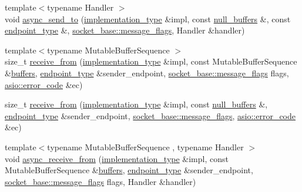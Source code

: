 \begin{DoxyCompactItemize}
\item 
{\footnotesize template$<$typename Handler $>$ }\\void \hyperlink{classasio_1_1detail_1_1reactive__socket__service_a44206a88181be24e860ff0d17de1cafd}{async\+\_\+send\+\_\+to} (\hyperlink{structasio_1_1detail_1_1reactive__socket__service_1_1implementation__type}{implementation\+\_\+type} \&impl, const \hyperlink{classasio_1_1null__buffers}{null\+\_\+buffers} \&, const \hyperlink{classasio_1_1detail_1_1reactive__socket__service_adad302be53c8a4ea6e7693bc88595381}{endpoint\+\_\+type} \&, \hyperlink{classasio_1_1socket__base_ac3cf77465dfedfe1979b5415cf32cc94}{socket\+\_\+base\+::message\+\_\+flags}, Handler \&handler)
\item 
{\footnotesize template$<$typename Mutable\+Buffer\+Sequence $>$ }\\size\+\_\+t \hyperlink{classasio_1_1detail_1_1reactive__socket__service_af0c9420eaeeecd92044741a5fadfe5e3}{receive\+\_\+from} (\hyperlink{structasio_1_1detail_1_1reactive__socket__service_1_1implementation__type}{implementation\+\_\+type} \&impl, const Mutable\+Buffer\+Sequence \&\hyperlink{group__async__read_ga54dede45c3175148a77fe6635222c47d}{buffers}, \hyperlink{classasio_1_1detail_1_1reactive__socket__service_adad302be53c8a4ea6e7693bc88595381}{endpoint\+\_\+type} \&sender\+\_\+endpoint, \hyperlink{classasio_1_1socket__base_ac3cf77465dfedfe1979b5415cf32cc94}{socket\+\_\+base\+::message\+\_\+flags} flags, \hyperlink{classasio_1_1error__code}{asio\+::error\+\_\+code} \&ec)
\item 
size\+\_\+t \hyperlink{classasio_1_1detail_1_1reactive__socket__service_a5b0347cdd0aefe067f10ba7150dce20a}{receive\+\_\+from} (\hyperlink{structasio_1_1detail_1_1reactive__socket__service_1_1implementation__type}{implementation\+\_\+type} \&impl, const \hyperlink{classasio_1_1null__buffers}{null\+\_\+buffers} \&, \hyperlink{classasio_1_1detail_1_1reactive__socket__service_adad302be53c8a4ea6e7693bc88595381}{endpoint\+\_\+type} \&sender\+\_\+endpoint, \hyperlink{classasio_1_1socket__base_ac3cf77465dfedfe1979b5415cf32cc94}{socket\+\_\+base\+::message\+\_\+flags}, \hyperlink{classasio_1_1error__code}{asio\+::error\+\_\+code} \&ec)
\item 
{\footnotesize template$<$typename Mutable\+Buffer\+Sequence , typename Handler $>$ }\\void \hyperlink{classasio_1_1detail_1_1reactive__socket__service_aeba17f9874014b285204b94d59719c81}{async\+\_\+receive\+\_\+from} (\hyperlink{structasio_1_1detail_1_1reactive__socket__service_1_1implementation__type}{implementation\+\_\+type} \&impl, const Mutable\+Buffer\+Sequence \&\hyperlink{group__async__read_ga54dede45c3175148a77fe6635222c47d}{buffers}, \hyperlink{classasio_1_1detail_1_1reactive__socket__service_adad302be53c8a4ea6e7693bc88595381}{endpoint\+\_\+type} \&sender\+\_\+endpoint, \hyperlink{classasio_1_1socket__base_ac3cf77465dfedfe1979b5415cf32cc94}{socket\+\_\+base\+::message\+\_\+flags} flags, Handler \&handler)

\end{DoxyCompactItemize}

